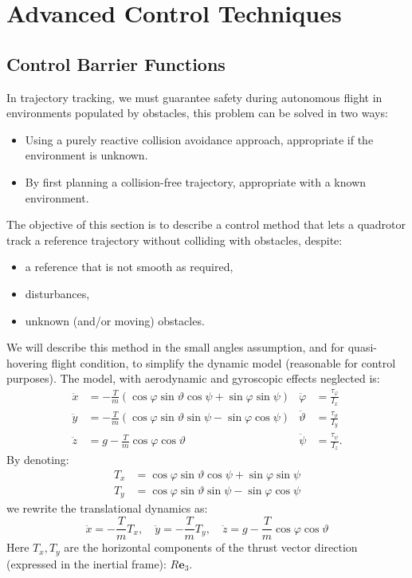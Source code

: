 \documentclass[10pt, a4paper]{report}
\begin{document}
\chapter{Advanced Control Techniques}
\section{Control Barrier Functions}
In trajectory tracking, we must guarantee safety during autonomous flight in environments populated by obstacles, this problem can be solved in two ways:\begin{itemize}
    \item Using a purely reactive collision avoidance approach, appropriate if the environment is unknown.
    \item By first planning a collision-free trajectory, appropriate with a known environment.
\end{itemize}
The objective of this section is to describe a control method that lets a quadrotor track a reference trajectory without colliding with obstacles, despite:\begin{itemize}
    \item a reference that is not smooth as required,
    \item disturbances,
    \item unknown (and/or moving) obstacles.
\end{itemize}
We will describe this method in the small angles assumption, and for quasi-hovering flight condition, to simplify the dynamic model (reasonable for control purposes). The model, with aerodynamic and gyroscopic effects neglected is:\begin{align}
    \ddot x&=-\frac{T}{m}(\cos\varphi\sin\vartheta\cos\psi+\sin\varphi\sin\psi)
    &\ddot\varphi&=\frac{\tau_\varphi}{I_x}\\
    \ddot y&=-\frac{T}{m}(\cos\varphi\sin\vartheta\sin\psi-\sin\varphi\cos\psi)
    &\ddot\vartheta&=\frac{\tau_\vartheta}{I_y}\\
    \ddot z&=g-\frac{T}{m}\cos\varphi\cos\vartheta
    &\ddot\psi&=\frac{\tau_\psi}{I_z}.
\end{align}
By denoting:\begin{align}
    T_x&=\cos\varphi\sin\vartheta\cos\psi+\sin\varphi\sin\psi\\
    T_y&=\cos\varphi\sin\vartheta\sin\psi-\sin\varphi\cos\psi
\end{align}
we rewrite the translational dynamics as:\begin{equation}
    \ddot x=-\frac{T}{m}T_x,\quad
    \ddot y=-\frac{T}{m}T_y,\quad
    \ddot z=g-\frac{T}{m}\cos\varphi\cos\vartheta
\end{equation}
Here $T_x,T_y$ are the horizontal components of the thrust vector direction (expressed in the inertial frame): $R\mathbf e_3$.
\end{document}

